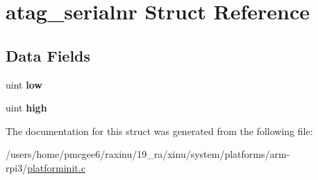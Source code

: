 \hypertarget{structatag__serialnr}{\section{atag\-\_\-serialnr Struct Reference}
\label{structatag__serialnr}
}
\subsection*{Data Fields}
\begin{DoxyCompactItemize}
\item 
\hypertarget{structatag__serialnr_a1a5a0b53e82a7798af556fba1f8a9883}{uint {\bfseries low}}\label{structatag__serialnr_a1a5a0b53e82a7798af556fba1f8a9883}

\item 
\hypertarget{structatag__serialnr_af4eedeb5bd17652645e204b12b34624c}{uint {\bfseries high}}\label{structatag__serialnr_af4eedeb5bd17652645e204b12b34624c}

\end{DoxyCompactItemize}


The documentation for this struct was generated from the following file\-:\begin{DoxyCompactItemize}
\item 
/users/home/pmcgee6/raxinu/19\-\_\-ra/xinu/system/platforms/arm-\/rpi3/\hyperlink{platforminit_8c}{platforminit.\-c}\end{DoxyCompactItemize}
